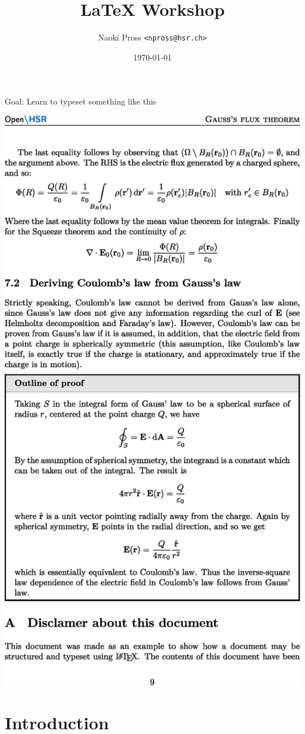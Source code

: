 \documentclass[xetex, onlymath]{beamer}
\title{\textrm{\LaTeX} Workshop}
\author[NaoPross]{Naoki Pross \texttt{<npross@hsr.ch>}}
\date{\today}
\institute[HSR]{Hochschule f\"ur Technik Rapperswil}
\begin{document}
\begin{frame}
\maketitle
\end{frame}

\begin{frame}{Goal: Learn to typeset something like this}
	\begin{center}
		\vspace{1cm}
		\includegraphics[width=.8\linewidth]{figs/gauss-flux}
	\end{center}
\end{frame}

\section{Introduction}
\end{document}
